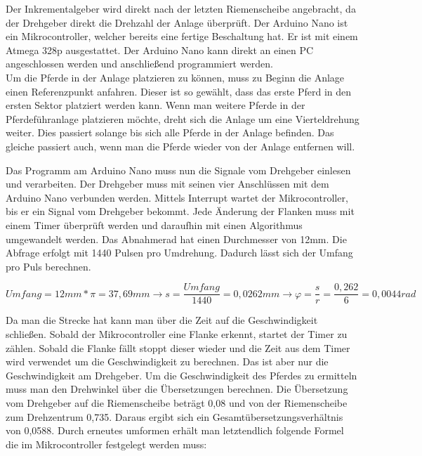Der Inkrementalgeber wird direkt nach der letzten Riemenscheibe angebracht, da der Drehgeber direkt die Drehzahl der Anlage überprüft. Der Arduino Nano ist ein Mikrocontroller, welcher bereits eine fertige Beschaltung hat. Er ist mit einem Atmega 328p ausgestattet. Der Arduino Nano kann direkt an einen PC angeschlossen werden und anschließend programmiert werden. \\
Um die Pferde in der Anlage platzieren zu können, muss zu Beginn die Anlage einen Referenzpunkt anfahren. Dieser ist so gewählt, dass das erste Pferd in den ersten Sektor platziert werden kann. Wenn man weitere Pferde in der Pferdeführanlage platzieren möchte, dreht sich die Anlage um eine Vierteldrehung weiter. Dies passiert solange bis sich alle Pferde in der Anlage befinden. Das gleiche passiert auch, wenn man die Pferde wieder von der Anlage entfernen will. \newline{}

Das Programm am Arduino Nano muss nun die Signale vom Drehgeber einlesen und verarbeiten. Der Drehgeber muss mit seinen vier Anschlüssen mit dem Arduino Nano verbunden werden.
Mittels Interrupt wartet der Mikrocontroller, bis er ein Signal vom Drehgeber bekommt. Jede Änderung der Flanken muss mit einem Timer überprüft werden und daraufhin mit einen Algorithmus umgewandelt werden. Das Abnahmerad hat einen Durchmesser von 12mm. Die Abfrage erfolgt mit 1440 Pulsen pro Umdrehung. Dadurch lässt sich der Umfang pro Puls berechnen.

\begin{center}
\begin{equation}
  \label{eq:7}
	Umfang = 12mm * \pi = 37,69mm \rightarrow s = \frac{Umfang}{1440} =  0,0262mm  \rightarrow \varphi = \frac{s}{r} = \frac{0,262}{6} = 0,0044rad
\end{equation} 
\end{center}

Da man die Strecke hat kann man über die Zeit auf die Geschwindigkeit schließen. Sobald der Mikrocontroller eine Flanke erkennt, startet der Timer zu zählen. Sobald die Flanke fällt stoppt dieser wieder und die Zeit aus dem Timer wird verwendet um die Geschwindigkeit zu berechnen. Das ist aber nur die Geschwindigkeit am Drehgeber. Um die Geschwindigkeit des Pferdes zu ermitteln muss man den Drehwinkel über die Übersetzungen berechnen. Die Übersetzung vom Drehgeber auf die Riemenscheibe beträgt 0,08 und von der Riemenscheibe zum Drehzentrum 0,735. Daraus ergibt sich ein Gesamtübersetzungsverhältnis von 0,0588. Durch erneutes umformen erhält man letztendlich folgende Formel die im Mikrocontroller festgelegt werden muss: 

